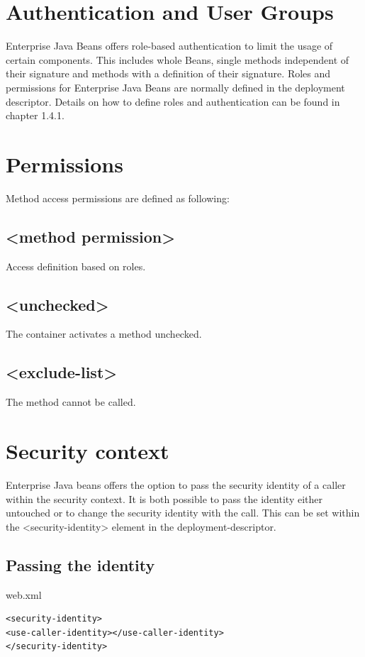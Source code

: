 \documentclass[12pt,a4paper]{report}
\begin{document}
\section{Authentication and User Groups}
Enterprise Java Beans offers role-based authentication to limit the usage of certain components. This includes whole Beans, single methods independent of their signature and methods with a definition of their signature.
Roles and permissions for Enterprise Java Beans are normally defined in the deployment descriptor. Details on how to define roles and authentication can be found in chapter 1.4.1.

\section{Permissions}
Method access permissions are defined as following:

\subsection{<method permission>}
Access definition based on roles.

\subsection{<unchecked>}
The container activates a method unchecked.

\subsection{<exclude-list>}
The method cannot be called.

\section{Security context}
Enterprise Java beans offers the option to pass the security identity of a caller within the security context. It is both possible to pass the identity either untouched or to change the security identity with the call. This can be set within the <security-identity> element in the deployment-descriptor.

\subsection{Passing the identity}
\begin{bclogo}[couleur=yellow!15,arrondi=0.1,logo=\bccrayon, ombre = true]{web.xml}
\begin{lstlisting}[style=XML]
<security-identity>
<use-caller-identity></use-caller-identity>
</security-identity>
\end{lstlisting}
\end{bclogo}
\end{document}
